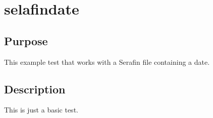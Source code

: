\chapter{selafindate}
%
%
\section{Purpose}
This example test that \stbtel works with a Serafin file containing a date.
%
\section{Description}
This is just a basic test.
%
%
%
%
%
%
%
%

%
